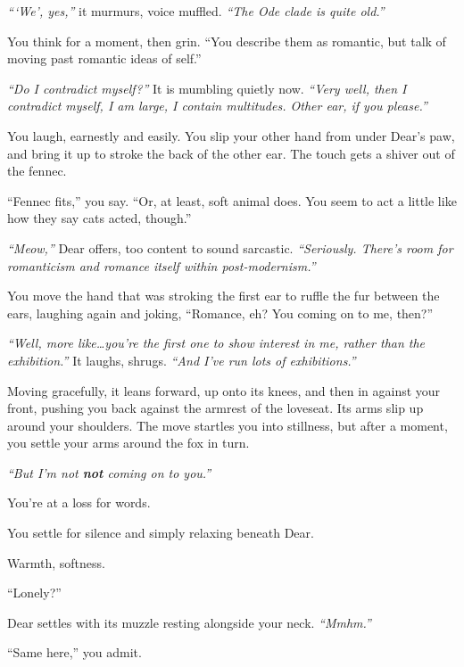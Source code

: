 \emph{```We', yes,''} it murmurs, voice muffled. \emph{``The Ode clade is quite old.''}

You think for a moment, then grin. ``You describe them as romantic, but talk of moving past romantic ideas of self.''

\emph{``Do I contradict myself?''} It is mumbling quietly now. \emph{``Very well, then I contradict myself, I am large, I contain multitudes. Other ear, if you please.''}

You laugh, earnestly and easily. You slip your other hand from under Dear's paw, and bring it up to stroke the back of the other ear. The touch gets a shiver out of the fennec.

``Fennec fits,'' you say. ``Or, at least, soft animal does. You seem to act a little like how they say cats acted, though.''

\emph{``Meow,''} Dear offers, too content to sound sarcastic. \emph{``Seriously. There's room for romanticism and romance itself within post-modernism.''}

You move the hand that was stroking the first ear to ruffle the fur between the ears, laughing again and joking, ``Romance, eh? You coming on to me, then?''

\emph{``Well, more like\ldots{}you're the first one to show interest in me, rather than the exhibition.''} It laughs, shrugs. \emph{``And I've run lots of exhibitions.''}

Moving gracefully, it leans forward, up onto its knees, and then in against your front, pushing you back against the armrest of the loveseat. Its arms slip up around your shoulders. The move startles you into stillness, but after a moment, you settle your arms around the fox in turn.

\emph{``But I'm not \textbf{not} coming on to you.''}

You're at a loss for words.

\phantom{You're at a loss for words. }{\scriptsize ``I'm flattered, but--''}

\phantom{You're at a loss for words. }{\tiny ``You're sweet, you know--''}

You settle for silence and simply relaxing beneath Dear.

Warmth, softness.

``Lonely?''

Dear settles with its muzzle resting alongside your neck. \emph{``Mmhm.''}

``Same here,'' you admit.

